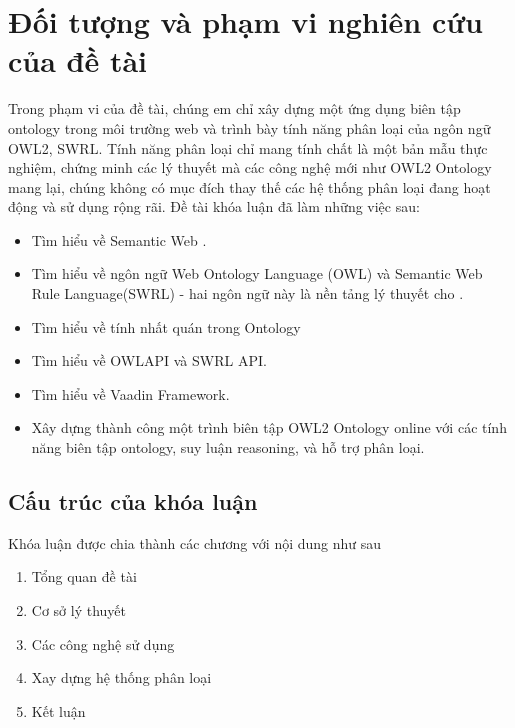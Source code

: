 \section{Đối tượng và phạm vi nghiên cứu của đề tài}
Trong phạm vi của đề tài, chúng em chỉ xây dựng một ứng dụng biên tập ontology trong môi trường web và trình bày tính năng phân loại của ngôn ngữ OWL2, SWRL. Tính năng phân loại chỉ mang tính chất là một bản mẫu thực nghiệm, chứng minh các lý thuyết mà các công nghệ mới như OWL2 Ontology mang lại, chúng không có mục đích thay thế các hệ thống phân loại đang hoạt động và sử dụng rộng rãi.
Đề tài khóa luận đã làm những việc sau:
\begin{itemize}
\item Tìm hiểu về Semantic Web .
\item Tìm hiểu về ngôn ngữ Web Ontology Language (OWL) và Semantic Web Rule Language(SWRL) - hai ngôn ngữ này là nền tảng lý thuyết cho .
\item Tìm hiểu về tính nhất quán trong Ontology
\item Tìm hiểu về OWLAPI và SWRL API.
\item Tìm hiểu về Vaadin Framework.
\item Xây dựng thành công một trình biên tập OWL2 Ontology online với các tính năng biên tập ontology, suy luận reasoning, và hỗ trợ phân loại.
\end{itemize}

\subsection{Cấu trúc của khóa luận}
Khóa luận được chia thành các chương với nội dung như sau
\begin{enumerate}
\item Tổng quan đề tài
\item Cơ sở lý thuyết
\item Các công nghệ sử dụng
\item Xay dựng hệ thống phân loại
\item Kết luận 
\end{enumerate}
